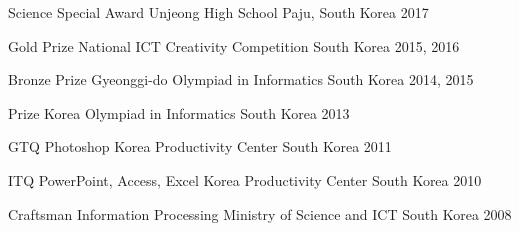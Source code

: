 \begin{cvhonors}

  \cvhonor
    {Science Special Award} %
    {Unjeong High School} %
    {Paju, South Korea} %
    {2017} %

  \cvhonor
    {Gold Prize} %
    {National ICT Creativity Competition} %
    {South Korea} %
    {2015, 2016} %

  \cvhonor
    {Bronze Prize} %
    {Gyeonggi-do Olympiad in Informatics} %
    {South Korea} %
    {2014, 2015} %

  \cvhonor
    {Prize} %
    {Korea Olympiad in Informatics} %
    {South Korea} %
    {2013} %

\end{cvhonors}




\begin{cvhonors}

  \cvhonor
    {GTQ Photoshop} %
    {Korea Productivity Center} %
    {South Korea} %
    {2011} %

  \cvhonor
    {ITQ PowerPoint, Access, Excel} %
    {Korea Productivity Center} %
    {South Korea} %
    {2010} %

  \cvhonor
    {Craftsman Information Processing} %
    {Ministry of Science and ICT} %
    {South Korea} %
    {2008} %

\end{cvhonors}

